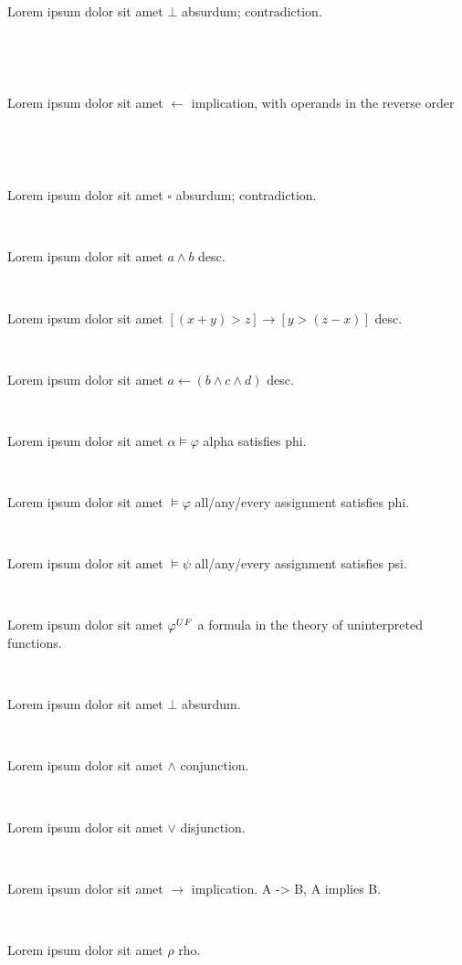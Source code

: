 \documentclass[12pt]{article}
\begin{document}
\centerline{~}

Lorem ipsum dolor sit amet $ \bot $ absurdum; contradiction.

\centerline{~}

\centerline{~}

Lorem ipsum dolor sit amet $ \leftarrow  $ implication, with operands in the reverse order

\centerline{~}

\centerline{~}

Lorem ipsum dolor sit amet $ \square $ absurdum; contradiction.

\centerline{~}


Lorem ipsum dolor sit amet $ a \wedge b $ desc.

\centerline{~}


Lorem ipsum dolor sit amet $ [ ( x + y ) > z ] \rightarrow [ y > ( z - x ) ] $ desc.

\centerline{~}


Lorem ipsum dolor sit amet $ a \leftarrow ( b \wedge c \wedge d )  $ desc.

\centerline{~}

Lorem ipsum dolor sit amet $ \alpha \vDash \varphi $ alpha satisfies phi.

\centerline{~}

Lorem ipsum dolor sit amet $ \vDash \varphi $ all/any/every assignment satisfies phi.

\centerline{~}

Lorem ipsum dolor sit amet $ \vDash \psi $ all/any/every assignment satisfies psi.

\centerline{~}

Lorem ipsum dolor sit amet $ \varphi^{\scriptsize UF} $ a formula in the theory of uninterpreted functions.

\centerline{~}

Lorem ipsum dolor sit amet $ \bot $ absurdum.

\centerline{~}

Lorem ipsum dolor sit amet $ \wedge $ conjunction.

\centerline{~}

Lorem ipsum dolor sit amet $ \vee $ disjunction.

\centerline{~}

Lorem ipsum dolor sit amet $ \rightarrow $ implication.  A -> B,  A implies B.

\centerline{~}

Lorem ipsum dolor sit amet $ \rho $ rho.
\end{document}
